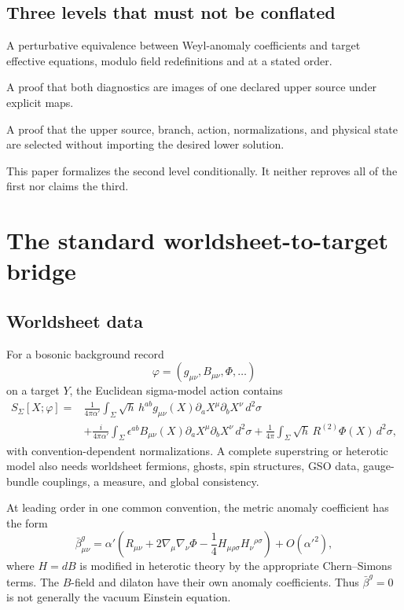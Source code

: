 \documentclass[11pt]{article}
\newcommand{\alphap}{\alpha'}
\begin{document}
\subsection{Three levels that must not be conflated}

\begin{description}[leftmargin=3.2cm,style=nextline]
\item[Standard bridge] A perturbative equivalence between Weyl-anomaly
coefficients and target effective equations, modulo field redefinitions and
at a stated order.
\item[MTT encoding] A proof that both diagnostics are images of one declared
upper source under explicit maps.
\item[MTT selection] A proof that the upper source, branch, action,
normalizations, and physical state are selected without importing the desired
lower solution.
\end{description}

This paper formalizes the second level conditionally.  It neither reproves all
of the first nor claims the third.

\section{The standard worldsheet-to-target bridge}

\subsection{Worldsheet data}

For a bosonic background record
\[
\varphi=(g_{\mu\nu},B_{\mu\nu},\Phi,\ldots)
\]
on a target \(Y\), the Euclidean sigma-model action contains
\begin{align}
S_\Sigma[X;\varphi]
={}&\frac{1}{4\pi\alphap}\int_\Sigma
\sqrt{h}\,h^{ab}g_{\mu\nu}(X)
\partial_aX^\mu\partial_bX^\nu\,d^2\sigma \nonumber\\
&+\frac{i}{4\pi\alphap}\int_\Sigma
\epsilon^{ab}B_{\mu\nu}(X)
\partial_aX^\mu\partial_bX^\nu\,d^2\sigma
+\frac{1}{4\pi}\int_\Sigma\sqrt h\,
R^{(2)}\Phi(X)\,d^2\sigma ,
\label{eq:sigma-action}
\end{align}
with convention-dependent normalizations.  A complete superstring or
heterotic model also needs worldsheet fermions, ghosts, spin structures,
GSO data, gauge-bundle couplings, a measure, and global consistency.

At leading order in one common convention, the metric anomaly coefficient has
the form
\begin{equation}
\bar\beta^g_{\mu\nu}
=\alphap\left(
R_{\mu\nu}+2\nabla_\mu\nabla_\nu\Phi
-\frac14H_{\mu\rho\sigma}H_\nu{}^{\rho\sigma}
\right)+O(\alphap^2),
\label{eq:metric-beta}
\end{equation}
where \(H=dB\) is modified in heterotic theory by the appropriate
Chern--Simons terms.  The \(B\)-field and dilaton have their own anomaly
coefficients.  Thus \(\bar\beta^g=0\) is not generally the vacuum Einstein
equation.
\end{document}
